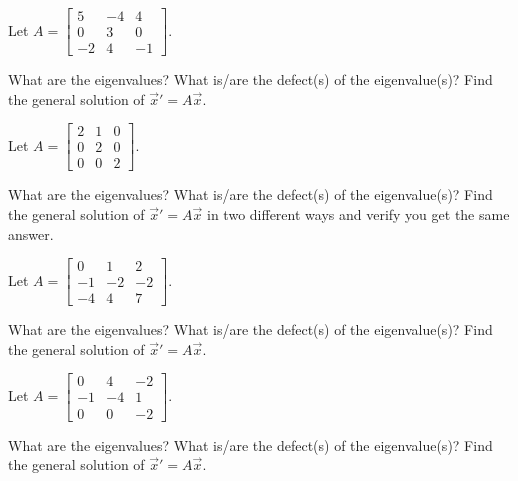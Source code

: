 \begin{samepage}
\begin{exercise}
Let
$A = \left[ \begin{smallmatrix}
5 & -4 & 4 \\
0 & 3 & 0 \\
-2 & 4 & -1
\end{smallmatrix} \right]$.
\begin{tasks}
\task What are the eigenvalues?
\task What is/are the defect(s) of the eigenvalue(s)?
\task Find the general solution of ${\vec{x}}' = A \vec{x}$.
\end{tasks}
\end{exercise}
\end{samepage}


\begin{exercise}
Let
$A = \left[ \begin{smallmatrix} 2 & 1 & 0 \\ 0 & 2 & 0 \\ 0 & 0 & 2 \end{smallmatrix} \right]$.
\begin{tasks}
\task What are the eigenvalues?
\task What is/are the defect(s) of the eigenvalue(s)?
\task Find the general solution of ${\vec{x}}' = A \vec{x}$ in two different
ways and verify you get the same answer.
\end{tasks}
\end{exercise}

\begin{exercise}
Let
$A = \left[ \begin{smallmatrix}
0 & 1 & 2 \\
-1 & -2 & -2 \\
-4 & 4 & 7
\end{smallmatrix} \right]$.
\begin{tasks}
\task What are the eigenvalues?
\task What is/are the defect(s) of the eigenvalue(s)?
\task Find the general solution of ${\vec{x}}' = A \vec{x}$.
\end{tasks}
\end{exercise}

\begin{exercise}
\pagebreak[2]
Let
$A = \left[ \begin{smallmatrix}
0 & 4 & -2 \\
-1 & -4 & 1 \\
0 & 0 & -2
\end{smallmatrix} \right]$.
\begin{tasks}
\task What are the eigenvalues?
\task What is/are the defect(s) of the eigenvalue(s)?
\task Find the general solution of ${\vec{x}}' = A \vec{x}$.
\end{tasks}
\end{exercise}

